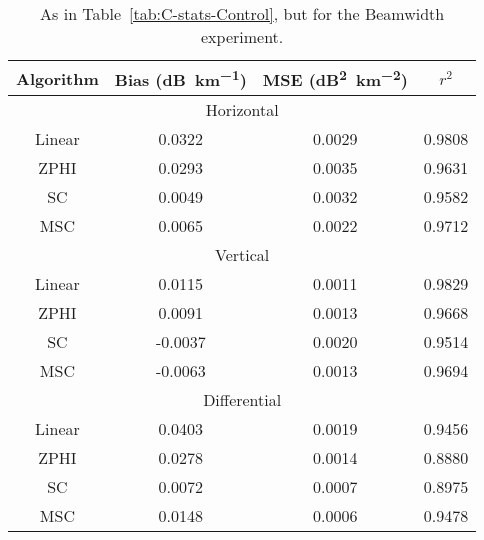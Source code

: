\begin{table}
    \centering
    \begin{tabular}{| c | c | c | c |}
        \hline
        Algorithm & Bias (\si{dB\per \kilo\meter}) & MSE (\si{dB\squared \per \kilo\meter \squared}) & $r^2$ \\
        \hline
        \hline
        \multicolumn{4}{|c|}{Horizontal}\\
        \hline
        Linear & 0.0322 & 0.0029 & 0.9808\\
        ZPHI & 0.0293 & 0.0035 & 0.9631\\
        SC & 0.0049 & 0.0032 & 0.9582\\
        MSC & 0.0065 & 0.0022 & 0.9712\\
        \hline
        \multicolumn{4}{|c|}{Vertical}\\
        \hline
        Linear & 0.0115 & 0.0011 & 0.9829\\
        ZPHI & 0.0091 & 0.0013 & 0.9668\\
        SC & -0.0037 & 0.0020 & 0.9514\\
        MSC & -0.0063 & 0.0013 & 0.9694\\
        \hline
        \multicolumn{4}{|c|}{Differential}\\
        \hline
        Linear & 0.0403 & 0.0019 & 0.9456\\
        ZPHI & 0.0278 & 0.0014 & 0.8880\\
        SC & 0.0072 & 0.0007 & 0.8975\\
        MSC & 0.0148 & 0.0006 & 0.9478\\
\hline
    \end{tabular}
    \caption{As in Table~\ref{tab:C-stats-Control}, but for
    the Beamwidth experiment.}
    \label{tab:C-stats-Beamwidth}
\end{table}
